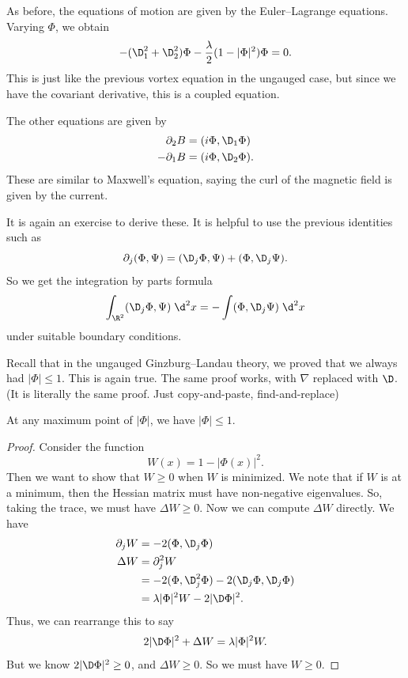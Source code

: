 \documentclass[a4paper]{article}
\begin{document}
As before, the equations of motion are given by the Euler--Lagrange equations. Varying $\Phi$, we obtain
\[
  - (\D_1^2 + \D_2^2) \Phi - \frac{\lambda}{2} (1 - |\Phi|^2)\Phi = 0.
\]
This is just like the previous vortex equation in the ungauged case, but since we have the covariant derivative, this is a coupled equation.

The other equations are given by
\begin{align*}
  \partial_2 B &= (i \Phi, \D_1 \Phi)\\
  -\partial_1 B &= (i \Phi, \D_2 \Phi).
\end{align*}
These are similar to Maxwell's equation, saying the curl of the magnetic field is given by the current.

It is again an exercise to derive these. It is helpful to use the previous identities such as
\[
  \partial_j (\Phi, \Psi) = (\D_j \Phi, \Psi) + (\Phi, \D_j \Psi).
\]
So we get the integration by parts formula
\[
  \int_{\R^2} (\D_j \Phi, \Psi)\;\d^2 x = - \int (\Phi, \D_j \Psi)\;\d^2 x
\]
under suitable boundary conditions.

Recall that in the ungauged Ginzburg--Landau theory, we proved that we always had $|\Phi| \leq 1$. This is again true. The same proof works, with $\nabla$ replaced with $\D$. (It is literally the same proof. Just copy-and-paste, find-and-replace)
\begin{lemma}
  At any maximum point of $|\Phi|$, we have $|\Phi| \leq 1$.
\end{lemma}

\begin{proof}
  Consider the function
  \[
    W(x) = 1 - |\Phi(x)|^2.
  \]
  Then we want to show that $W \geq 0$ when $W$ is minimized. We note that if $W$ is at a minimum, then the Hessian matrix must have non-negative eigenvalues. So, taking the trace, we must have $\Delta W \geq 0$. Now we can compute $\Delta W$ directly. We have
  \begin{align*}
    \partial_j W &= -2 (\Phi, \D_j \Phi)\\
    \Delta W &= \partial_j^2 W \\
    &= - 2(\Phi, \D_j^2 \Phi) - 2(\D_j \Phi, \D_j \Phi)\\
    &= \lambda |\Phi|^2 W - 2 |\D \Phi|^2.
  \end{align*}
  Thus, we can rearrange this to say
  \[
    2 |\D \Phi|^2 + \Delta W = \lambda |\Phi|^2 W.
  \]
  But we know $2 |\D \Phi|^2 \geq 0$, and $\Delta W \geq 0$. So we must have $W \geq 0$.
\end{proof}
\end{document}
